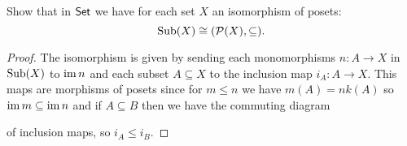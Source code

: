 \begin{exercise}{9.3}
    Show that in $\normalfont\mathsf{Set}$ we have for each set $X$ an isomorphism of posets:
    \[ \operatorname{Sub}(X)\cong(\mathcal{P}(X),\subseteq). \]
\end{exercise}
\begin{solution}
    \begin{proof}
        The isomorphism is given by sending each monomorphisms $n\colon A\to X$ in $\operatorname{Sub}(X)$ to $\operatorname{im} n$ and each subset $A\subseteq X$ to the inclusion map $i_A\colon A\to X$. 
        This maps are morphisms of posets since for $m\leq n$ we have $m(A)=nk(A)$ so $\operatorname{im} m\subseteq\operatorname{im} n$ and if $A\subseteq B$ then we have the commuting diagram 
            of inclusion maps, so $i_A\leq i_B$.
    \end{proof}
\end{solution}